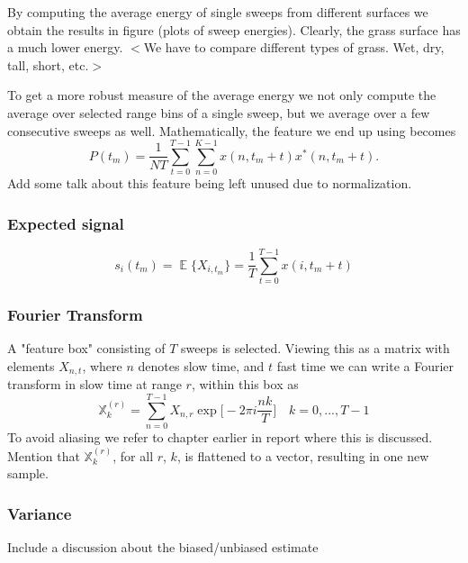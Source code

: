 \documentclass[a4paper, 12pt]{article}
\DeclareMathOperator*{\E}{\mathbb{E}}
\begin{document}
By computing the average energy of single sweeps from different surfaces we obtain the results in figure (plots of sweep energies). Clearly, the grass surface has a much lower energy. $<$We have to compare different types of grass. Wet, dry, tall, short, etc.$>$

To get a more robust measure of the average energy we not only compute the average over selected range bins of a single sweep, but we average over a few consecutive sweeps as well. Mathematically, the feature we end up using becomes
\begin{equation}
	P(t_m) = \frac{1}{NT}\sum_{t=0}^{T-1}\sum_{n=0}^{K-1}x(n, t_m + t)x^*(n, t_m + t).
\end{equation}
Add some talk about this feature being left unused due to normalization.




\subsubsection{Expected signal}

\begin{equation}
	s_i(t_m) = \E\{X_{i,t_m}\} = \frac{1}{T}\sum_{t=0}^{T-1}x(i, t_m + t)
\end{equation}


\subsubsection{Fourier Transform}
A "feature box" consisting of $T$ sweeps is selected. Viewing this as a matrix with elements $X_{n,t}$, where $n$ denotes slow time, and $t$ fast time we can write a Fourier transform in slow time at range $r$, within this box as
\begin{equation}
	\mathbb{X}_k^{(r)} = \sum_{n=0}^{T-1}X_{n,r}\exp\Big[-2\pi i\frac{nk}{T}\Big] \quad k=0, ..., T-1
\end{equation}
To avoid aliasing we refer to chapter earlier in report where this is discussed. Mention that $\mathbb{X}_k^{(r)}$, for all $r$, $k$, is flattened to a vector, resulting in one new sample.




\subsubsection{Variance}

Include a discussion about the biased/unbiased estimate \\
\end{document}
